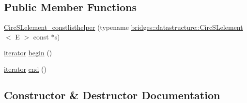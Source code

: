 \subsection*{Public Member Functions}
\begin{DoxyCompactItemize}
\item 
\hyperlink{classbridges_1_1datastructure_1_1_circ_s_lelement_1_1_circ_s_lelement__constlisthelper_af174ab008506dd4b814660e6abc571b1}{Circ\+S\+Lelement\+\_\+constlisthelper} (typename \hyperlink{classbridges_1_1datastructure_1_1_circ_s_lelement}{bridges\+::datastructure\+::\+Circ\+S\+Lelement}$<$ E $>$ const $\ast$s)
\item 
\hyperlink{classbridges_1_1datastructure_1_1_circ_s_lelement_1_1_circ_s_lelement__constlisthelper_1_1iterator}{iterator} \hyperlink{classbridges_1_1datastructure_1_1_circ_s_lelement_1_1_circ_s_lelement__constlisthelper_a57653761fb7c0ad519a9415c77d1f4c4}{begin} ()
\item 
\hyperlink{classbridges_1_1datastructure_1_1_circ_s_lelement_1_1_circ_s_lelement__constlisthelper_1_1iterator}{iterator} \hyperlink{classbridges_1_1datastructure_1_1_circ_s_lelement_1_1_circ_s_lelement__constlisthelper_a93f42a63638e54e427648d7182b44d42}{end} ()
\end{DoxyCompactItemize}


\subsection{Constructor \& Destructor Documentation}
\mbox{\label{classbridges_1_1datastructure_1_1_circ_s_lelement_1_1_circ_s_lelement__constlisthelper_af174ab008506dd4b814660e6abc571b1}} 
